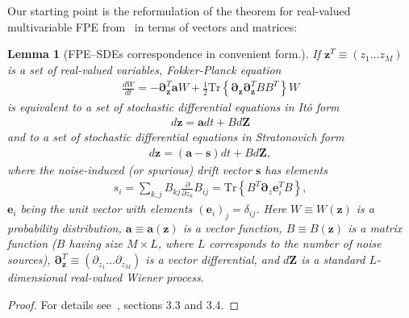 \documentclass[12pt,aip,jmp,amssymb,amsmath]{revtex4-1}
\newtheorem{lemma}{Lemma}
\begin{document}
Our starting point is the reformulation of the theorem for real-valued multivariable FPE from~\cite{Risken1996} in terms of vectors and matrices:

\begin{lemma}[FPE--SDEs correspondence in convenient form.]
\label{lmm:app-fpe:fpe-sde-real}
    If $\boldsymbol{z}^T \equiv (z_1 \ldots z_M)$ is a set of real-valued variables,
    Fokker-Planck equation
    \begin{equation*}\begin{split}
        \frac{dW}{dt}
        = -\boldsymbol{\partial}_{\boldsymbol{z}}^T \boldsymbol{a} W
        + \frac{1}{2} \mathrm{Tr} \left\{ \boldsymbol{\partial}_{\boldsymbol{z}} \boldsymbol{\partial}_{\boldsymbol{z}}^T B B^T \right\} W
    \end{split}\end{equation*}
    is equivalent to a set of stochastic differential equations in It\^{o} form
    \begin{equation*}\begin{split}
        d\boldsymbol{z} = \boldsymbol{a} dt + B d\boldsymbol{Z}
    \end{split}\end{equation*}
    and to a set of stochastic differential equations in Stratonovich form
    \begin{equation*}\begin{split}
        d\boldsymbol{z} = (\boldsymbol{a} - \boldsymbol{s})dt + B d\boldsymbol{Z},
    \end{split}\end{equation*}
    where the noise-induced (or spurious) drift vector $\boldsymbol{s}$ has elements
    \begin{equation*}\begin{split}
        s_i
        = \sum_{k,j} B_{kj} \frac{\partial}{\partial z_k} B_{ij}
        = \mathrm{Tr} \left\{ B^T \boldsymbol{\partial}_z \boldsymbol{e}_i^T B \right\},
    \end{split}\end{equation*}
    $\boldsymbol{e}_i$ being the unit vector with elements $(\boldsymbol{e}_i)_j = \delta_{ij}$.
    Here $W \equiv W(\boldsymbol{z})$ is a probability distribution,
    $\boldsymbol{a} \equiv \boldsymbol{a}(\boldsymbol{z})$ is a vector function,
    $B \equiv B(\boldsymbol{z})$ is a matrix function ($B$ having size $M \times L$, where $L$ corresponds to the number of noise sources),
    $\boldsymbol{\partial}_{\boldsymbol{z}}^T \equiv (\partial_{z_1} \ldots \partial_{z_M})$ is a vector differential,
    and $d\boldsymbol{Z}$ is a standard $L$-dimensional real-valued Wiener process.
\end{lemma}
\begin{proof}
For details see~\cite{Risken1996}, sections 3.3 and 3.4.
\end{proof}
\end{document}
